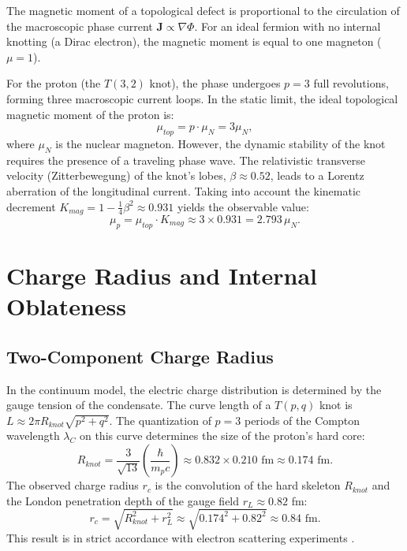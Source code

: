 \documentclass[12pt,a4paper]{article}
\begin{document}
	The magnetic moment of a topological defect is proportional to the circulation of the macroscopic phase current $\mathbf{J} \propto \nabla \Phi$. For an ideal fermion with no internal knotting (a Dirac electron), the magnetic moment is equal to one magneton ($\mu = 1$). 
	
	For the proton (the $T(3,2)$ knot), the phase undergoes $p=3$ full revolutions, forming three macroscopic current loops. In the static limit, the ideal topological magnetic moment of the proton is:
	\begin{equation}
		\mu_{top} = p \cdot \mu_N = 3 \mu_N,
	\end{equation}
	where $\mu_N$ is the nuclear magneton. 
	However, the dynamic stability of the knot requires the presence of a traveling phase wave. The relativistic transverse velocity (Zitterbewegung) of the knot's lobes, $\beta \approx 0.52$, leads to a Lorentz aberration of the longitudinal current. Taking into account the kinematic decrement $K_{mag} = 1 - \frac{1}{4}\beta^2 \approx 0.931$ yields the observable value:
	\begin{equation}
		\mu_{p} = \mu_{top} \cdot K_{mag} \approx 3 \times 0.931 = 2.793 \, \mu_N.
	\end{equation}
	
	\section{Charge Radius and Internal Oblateness}
	
	\subsection{Two-Component Charge Radius}
	In the continuum model, the electric charge distribution is determined by the gauge tension of the condensate. The curve length of a $T(p,q)$ knot is $L \approx 2\pi R_{knot} \sqrt{p^2+q^2}$. The quantization of $p=3$ periods of the Compton wavelength $\lambda_C$ on this curve determines the size of the proton's hard core:
	\begin{equation}
		R_{knot} = \frac{3}{\sqrt{13}} \left( \frac{\hbar}{m_p c} \right) \approx 0.832 \times 0.210 \text{ fm} \approx 0.174 \text{ fm}.
	\end{equation}
	The observed charge radius $r_c$ is the convolution of the hard skeleton $R_{knot}$ and the London penetration depth of the gauge field $r_{L} \approx 0.82$ fm:
	\begin{equation}
		r_c = \sqrt{R_{knot}^2 + r_{L}^2} \approx \sqrt{0.174^2 + 0.82^2} \approx 0.84 \text{ fm}.
	\end{equation}
	This result is in strict accordance with electron scattering experiments \cite{nature_radius}.
	
\end{document}
